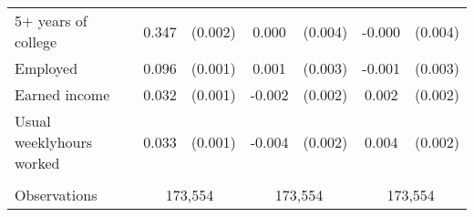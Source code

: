 \begin{tabular}{lcccccc}
 \hspace{0.3cm} 5$+$ years of college  & 0.347 & (0.002)  & 0.000 & (0.004)  & -0.000 & (0.004)  \\
 Employed  & 0.096 & (0.001)  & 0.001 & (0.003)  & -0.001 & (0.003)  \\
 Earned income  & 0.032 & (0.001)  & -0.002 & (0.002)  & 0.002 & (0.002)  \\
 Usual weeklyhours worked  & 0.033 & (0.001)  & -0.004 & (0.002)  & 0.004 & (0.002)  \\
\\
Observations & \multicolumn{2}{c}{173,554} & \multicolumn{2}{c}{173,554} & \multicolumn{2}{c}{173,554} \\
\bottomrule
\bottomrule
\end{tabular}